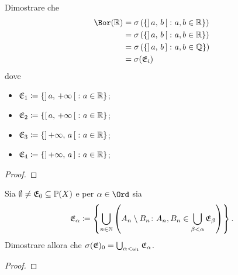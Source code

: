 \documentclass[../EserciziIstituzioniAnalisi.tex]{subfiles}
\begin{document}
\begin{exercise}[2016-10-10-1]
  Dimostrare che
  \begin{equation}
    \begin{aligned}    
      \Bor (\R) & = \sigma \left(\left\{ \ioo{a}{b} \st a, b \in \R \right\} \right) \\
      & = \sigma \left(\left\{\ioo{a}{b} \st a, b \in \R \right\}\right) \\
      & = \sigma \left(\left\{\ioc{a}{b} \st a, b \in \Q \right\}\right) \\
      & = \sigma (\E_i)
    \end{aligned}
  \end{equation}
  dove
  \begin{itemize}
    \item $\mathfrak E_{1}\coloneqq \{\left]\,a,\,+\infty\,\right[ \colon a \in \mathbb R\}$;
    \item $\mathfrak E_{2}\coloneqq \{\left[\,a,\,+\infty\,\right[ \colon a \in \mathbb R\}$;
    \item $\mathfrak E_{3}\coloneqq \{\left]\,+\infty,\,a\,\right[ \colon a \in \mathbb R\}$;
    \item $\mathfrak E_{4}\coloneqq \{\left]\,+\infty,\,a\,\right] \colon a \in \mathbb R\}$;
\end{itemize}
\end{exercise}
\begin{proof}
  
\end{proof}

\begin{exercise}  
  Sia $\emptyset \neq \mathfrak E_0 \subseteq \mathbb P(X)$ e per $\alpha \in \Ord$ sia 
\begin{equation}
  \mathfrak E_{\alpha}\coloneqq \left\{ \bigcup_{n\in \mathbb N} \left(A_n\setminus B_n \colon A_n,B_n \in \bigcup_{\beta<\alpha}\mathfrak E_{\beta}\right)\right\}.
\end{equation}
Dimostrare allora che $\sigma(\mathfrak E)_0=\bigcup_{\alpha<\omega_1}\mathfrak E_{\alpha}$.
\end{exercise}
\begin{proof}
  
\end{proof}
\end{document}
